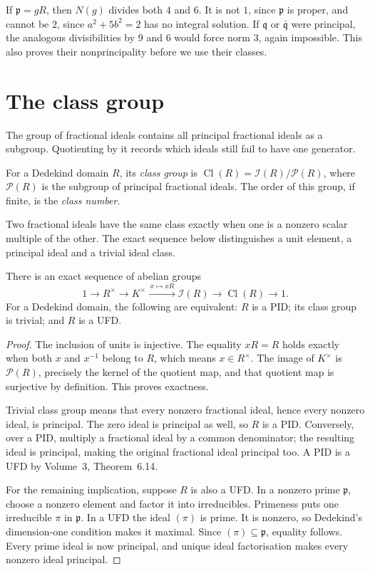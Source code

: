 If $\mathfrak p=gR$, then $N(g)$ divides both $4$ and $6$. It is not $1$, since $\mathfrak p$ is proper, and cannot be $2$, since $a^2+5b^2=2$ has no integral solution. If $\mathfrak q$ or $\bar{\mathfrak q}$ were principal, the analogous divisibilities by $9$ and $6$ would force norm $3$, again impossible. This also proves their nonprincipality before we use their classes.

\section{The class group}

The group of fractional ideals contains all principal fractional ideals as a subgroup. Quotienting by it records which ideals still fail to have one generator.

\begin{definition}\label{def:classgroup}
For a Dedekind domain $R$, its \emph{class group} is $\operatorname{Cl}(R)=\mathcal I(R)/\mathcal P(R)$, where $\mathcal P(R)$ is the subgroup of principal fractional ideals. The order of this group, if finite, is the \emph{class number}.
\end{definition}

Two fractional ideals have the same class exactly when one is a nonzero scalar multiple of the other. The exact sequence below distinguishes a unit element, a principal ideal and a trivial ideal class.

\begin{proposition}\label{prop:classseq}
There is an exact sequence of abelian groups
\[
1\longrightarrow R^\times\longrightarrow K^\times
 \xrightarrow{\,x\mapsto xR\,}\mathcal I(R)
 \longrightarrow\operatorname{Cl}(R)\longrightarrow1.
\]
For a Dedekind domain, the following are equivalent: $R$ is a PID; its class group is trivial; and $R$ is a UFD.
\end{proposition}

\begin{proof}
The inclusion of units is injective. The equality $xR=R$ holds exactly when both $x$ and $x^{-1}$ belong to $R$, which means $x\in R^\times$. The image of $K^\times$ is $\mathcal P(R)$, precisely the kernel of the quotient map, and that quotient map is surjective by definition. This proves exactness.

Trivial class group means that every nonzero fractional ideal, hence every nonzero ideal, is principal. The zero ideal is principal as well, so $R$ is a PID. Conversely, over a PID, multiply a fractional ideal by a common denominator; the resulting ideal is principal, making the original fractional ideal principal too. A PID is a UFD by Volume~3, Theorem~6.14.

For the remaining implication, suppose $R$ is also a UFD. In a nonzero prime $\mathfrak p$, choose a nonzero element and factor it into irreducibles. Primeness puts one irreducible $\pi$ in $\mathfrak p$. In a UFD the ideal $(\pi)$ is prime. It is nonzero, so Dedekind's dimension-one condition makes it maximal. Since $(\pi)\subseteq\mathfrak p$, equality follows. Every prime ideal is now principal, and unique ideal factorisation makes every nonzero ideal principal.
\end{proof}

